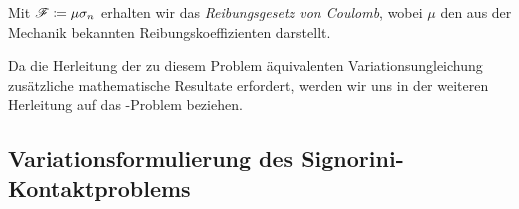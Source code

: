 \begin{itemize}
\begin{bem}
Mit $\mathscr F \coloneqq \mu \sigma_n$ erhalten wir das \textit{Reibungsgesetz von Coulomb}, wobei $\mu$ den aus der Mechanik bekannten Reibungskoeffizienten darstellt.

Da die Herleitung der zu diesem Problem äquivalenten Variationsungleichung zusätzliche mathematische Resultate erfordert, werden wir uns in der weiteren Herleitung auf das -Problem beziehen.
\end{bem}
\end{itemize}






\subsection{Variationsformulierung des Signorini-Kontaktproblems}
\label{kap:3.2.2}

